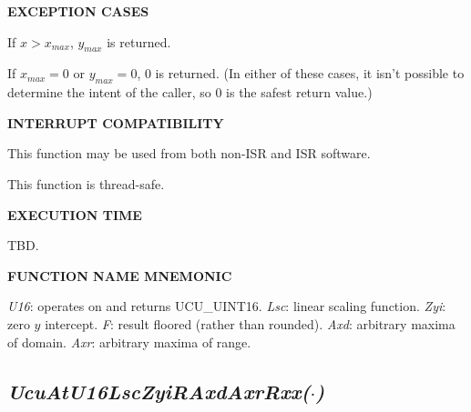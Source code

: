 \noindent\textbf{EXCEPTION CASES}
\begin{list}{}{\setlength{\leftmargin}{0.25in}\setlength{\topsep}{0.0in}}
\item If $x>x_{max}$, $y_{max}$ is returned.
\item If $x_{max}=0$ or $y_{max}=0$, 0 is returned.  (In either of these
      cases, it isn't possible to determine the intent of the caller,
      so 0 is the safest return value.)
\end{list}
\vspace{2.8ex}

\noindent\textbf{INTERRUPT COMPATIBILITY}
\begin{list}{}{\setlength{\leftmargin}{0.25in}\setlength{\topsep}{0.0in}}
\item This function may be used from both non-ISR and ISR software.
\item This function is thread-safe.
\end{list}
\vspace{2.8ex}

\noindent\textbf{EXECUTION TIME}
\begin{list}{}{\setlength{\leftmargin}{0.25in}\setlength{\topsep}{0.0in}}
\item TBD.
\end{list}
\vspace{2.8ex}

\noindent\textbf{FUNCTION NAME MNEMONIC}
\begin{list}{}{\setlength{\leftmargin}{0.25in}\setlength{\topsep}{0.0in}}
\item \emph{U16}: operates on and returns UCU\_UINT16.
      \emph{Lsc}: linear scaling function.
      \emph{Zyi}: zero $y$ intercept.
      \emph{F}:   result floored (rather than rounded).
      \emph{Axd}: arbitrary maxima of domain.
      \emph{Axr}: arbitrary maxima of range.
\end{list}


\subsection[\emph{UcuAtU16LscZyiRAxdAxrRxx(\protect\mbox{\protect$\cdot$})}]
           {\emph{UcuAtU16LscZyiRAxdAxrRxx(\protect\mbox{\protect\boldmath $\cdot$})}}
\label{cafn0:slsf0:sfaa1}

